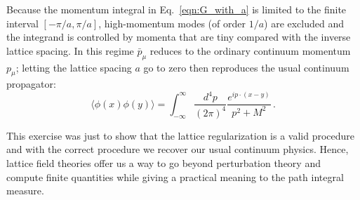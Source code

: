 \documentclass[11pt]{article}
\theoremstyle{definition}
\begin{document}
Because the momentum integral in Eq.~\eqref{eqn:G_with_a} is limited to the finite interval $[-\pi/a, \pi/a]$, high-momentum modes (of order $1/a$) are excluded and the integrand is controlled by momenta that are tiny compared with the inverse lattice spacing. In this regime $\bar{p}_\mu$ reduces to the ordinary continuum momentum $p_\mu$; letting the lattice spacing $a$ go to zero then reproduces the usual continuum propagator:
\begin{equation}
\langle \phi(x)\phi(y) \rangle = \int_{-\infty}^{\infty} \frac{d^4 p}{(2\pi)^4} \frac{e^{i p \cdot (x-y)}}{p^2 + M^2}\,.
\end{equation}

This exercise was just to show that the lattice regularization is a valid procedure and with the correct procedure we recover our usual continuum physics. Hence, lattice field theories offer us a way to go beyond perturbation theory and compute finite quantities while giving a practical meaning to the path integral measure.


\end{document}
